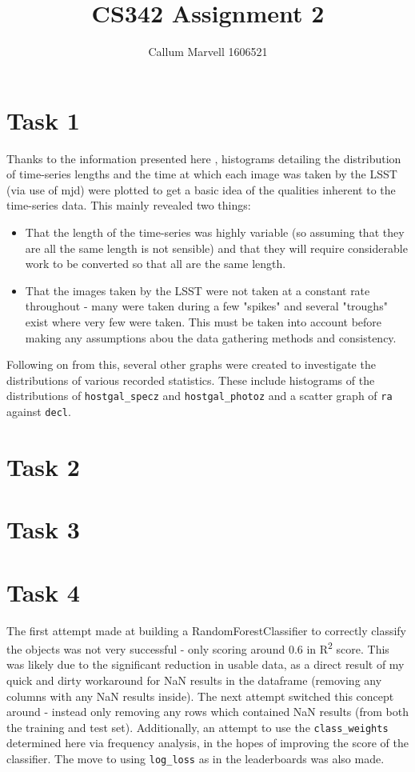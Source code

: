 \documentclass[11pt]{article}
\title{CS342 Assignment 2}
\author{Callum Marvell 1606521}
\begin{document}
\maketitle

\section{Task 1}
Thanks to the information presented here \cite{flux_graph}, histograms detailing the distribution of time-series lengths and the time at which each image was taken by the LSST (via use of mjd) were plotted to get a basic idea of the qualities inherent to the time-series data. This mainly revealed two things:
\begin{itemize}
	\item That the length of the time-series was highly variable (so assuming that they are all the same length is not sensible) and that they will require considerable work to be converted so that all are the same length.
	\item That the images taken by the LSST were not taken at a constant rate throughout - many were taken during a few "spikes" and several "troughs" exist where very few were taken. This must be taken into account before making any assumptions abou the data gathering methods and consistency.
\end{itemize}
Following on from this, several other graphs were created to investigate the distributions of various recorded statistics. These include histograms of the distributions of \lstinline!hostgal_specz! and \lstinline!hostgal_photoz! and a scatter graph of \lstinline!ra! against \lstinline!decl!.
	
\section{Task 2}

\section{Task 3}

\section{Task 4}
The first attempt made at building a RandomForestClassifier to correctly classify the objects was not very successful - only scoring around 0.6 in R\textsuperscript{2} score. This was likely due to the significant reduction in usable data, as a direct result of my quick and dirty workaround for NaN results in the dataframe (removing any columns with any NaN results inside). The next attempt switched this concept around - instead only removing any rows which contained NaN results (from both the training and test set). Additionally, an attempt to use the \lstinline!class_weights! determined here \cite{class_weights} via frequency analysis, in the hopes of improving the score of the classifier. The move to using \lstinline!log_loss! as in the leaderboards was also made.
\end{document}
